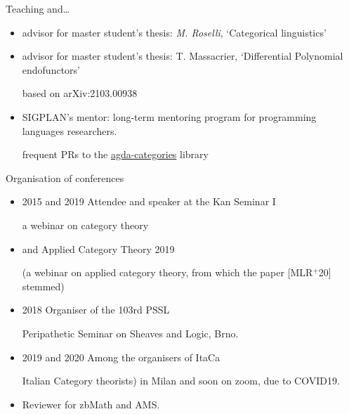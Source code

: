 \documentclass[handout]{beamer}
\def\lnk#1{\href{#1}{\faFilePdfO}}
\begin{document}
\begin{frame}{Teaching and\dots}\small
  \begin{itemize}
    \item<+-> advisor for master student's thesis: \emph{M. Roselli}, `Categorical linguistics'
    \item<+-> advisor for master student's thesis: T. Massacrier, `Differential Polynomial endofunctors'

    {\footnotesize\color{gray!40} based on arXiv:2103.00938\lnk{https://arxiv.org/abs/2103.00938}}
    \item<+-> SIGPLAN's mentor: long-term mentoring program for programming languages researchers.

    {\footnotesize\color{gray!40} frequent PRs to the \href{https://github.com/agda/agda-categories}{agda-categories} library}

\end{itemize}
\end{frame}
\begin{frame}{Organisation of conferences}\small
  \begin{itemize}
    \item<+-> 2015 and 2019 Attendee and speaker at the \alert{Kan Seminar I}

    {\footnotesize\color{gray!40} a webinar on category theory}
    \item<+-> and \alert{Applied Category Theory} 2019

    {\footnotesize\color{gray!40} (a webinar on applied category theory, from which the paper [\alert{MLR$^{+}$20}\lnk{https://arxiv.org/abs/2001.07488}] stemmed)}
    \item<+-> 2018 \alert{Organiser} of the 103rd \alert{PSSL}

    {\footnotesize\color{gray!40} Peripathetic Seminar on Sheaves and Logic, Brno.}
    \item<+-> 2019 and 2020 Among the \alert{organisers} of ItaCa

    {\footnotesize\color{gray!40}  \alert{Ita}lian \alert{Ca}tegory theorists) in Milan and soon on zoom, due to COVID19.}
    \item<+-> Reviewer for zbMath and AMS.
  \end{itemize}
\end{frame}
%
%
%
%
%
%
%
\end{document}
